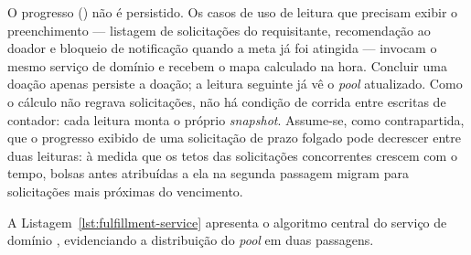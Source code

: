 O progresso () não é persistido. Os casos de uso de leitura que precisam exibir o preenchimento --- listagem de solicitações do requisitante, recomendação ao doador e bloqueio de notificação quando a meta já foi atingida --- invocam o mesmo serviço de domínio e recebem o mapa calculado na hora. Concluir uma doação apenas persiste a doação; a leitura seguinte já vê o \textit{pool} atualizado. Como o cálculo não regrava solicitações, não há condição de corrida entre escritas de contador: cada leitura monta o próprio \textit{snapshot}. Assume-se, como contrapartida, que o progresso exibido de uma solicitação de prazo folgado pode decrescer entre duas leituras: à medida que os tetos das solicitações concorrentes crescem com o tempo, bolsas antes atribuídas a ela na segunda passagem migram para solicitações mais próximas do vencimento.

A Listagem~\ref{lst:fulfillment-service} apresenta o algoritmo central do serviço de domínio , evidenciando a distribuição do \textit{pool} em duas passagens.

